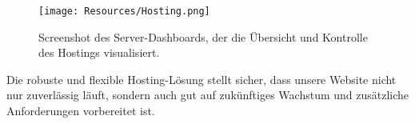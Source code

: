 \begin{figure}[H]
\centering
\texttt{[image: Resources/Hosting.png]}
\caption{Screenshot des Server-Dashboards, der die Übersicht und Kontrolle des Hostings visualisiert.}
\end{figure}

Die robuste und flexible Hosting-Lösung stellt sicher, dass unsere Website nicht nur zuverlässig läuft, sondern auch gut auf zukünftiges Wachstum und zusätzliche Anforderungen vorbereitet ist.

